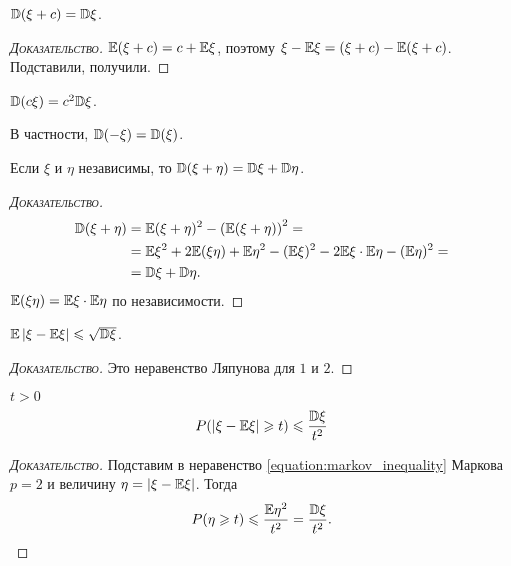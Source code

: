 \begin{prop}
 $ \mathbb D(\xi + c) = \mathbb D\xi $.
\end{prop}
\begin{proof}[\normalfont\textsc{Доказательство}]
 $ \mathbb E(\xi + c) = c + \mathbb E\xi $, поэтому $ \xi - \mathbb E\xi = (\xi + c) - \mathbb E(\xi + c) $. Подставили, получили.
\end{proof}
\begin{prop}
 $ \mathbb D(c\xi) = c^{2}\mathbb D\xi $.

 В частности, $ \mathbb D(-\xi) = \mathbb D(\xi) $.
\end{prop}
\begin{prop}
 Если $ \xi  $ и $ \eta $ независимы, то $ \mathbb D(\xi + \eta) = \mathbb D\xi + \mathbb D\eta $.
\end{prop}
\begin{proof}[\normalfont\textsc{Доказательство}]
 \begin{align*}
  \mathbb D(\xi + \eta) &= \mathbb E(\xi + \eta)^{2} - \left( \mathbb E(\xi+\eta) \right)^{2} = \\
  &= \mathbb E\xi^{2} + 2\mathbb E(\xi\eta) + \mathbb E\eta^{2} -  (\mathbb E\xi)^{2} - 2\mathbb E\xi \cdot \mathbb E\eta - (\mathbb E\eta)^{2} = \\
  &=\mathbb D\xi+\mathbb D\eta.
 \end{align*} $ \mathbb E(\xi\eta) = \mathbb E\xi \cdot \mathbb E\eta $ по независимости.
\end{proof}

\begin{prop}
 $ \mathbb E \left| \xi - \mathbb E\xi \right| \leqslant \sqrt{\mathbb D\xi} $.
\end{prop}
\begin{proof}[\normalfont\textsc{Доказательство}]
 Это неравенство Ляпунова для $ 1 $ и $ 2 $.
\end{proof}

\begin{prop}
 \label{proposition:chebyshev_inequality}
 $ t > 0 $
 \begin{align}
  \label{equation:chebyshev_inequality}
  P(\left| \xi - \mathbb E\xi \right| \geqslant t) \leqslant \frac{\mathbb D\xi}{t^{2}}
 \end{align} 
\end{prop}
\begin{proof}[\normalfont\textsc{Доказательство}]
 Подставим в неравенство \eqref{equation:markov_inequality} Маркова $ p=2 $ и величину $ \eta = \left| \xi - \mathbb E\xi \right| $. Тогда
 \begin{align*}
  P(\eta \geqslant t) \leqslant \frac{\mathbb E\eta^{2}}{t^{2}} = \frac{\mathbb D\xi}{t^{2}}.
 \end{align*} 
\end{proof}

